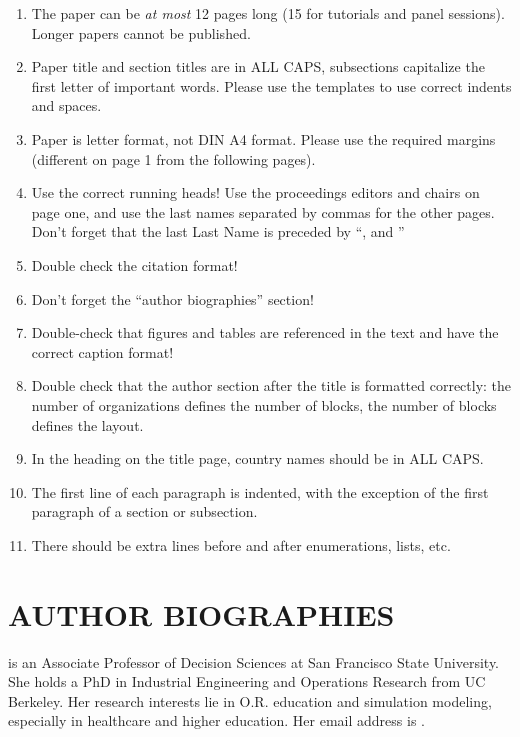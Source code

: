 \documentclass{wscpaperproc}
\theoremstyle{wsc}
\begin{document}
\begin{enumerate}
\item   The paper can be \textit{at most} 12 pages long (15 for tutorials and panel sessions). Longer papers cannot be published.
\item	Paper title and section titles are in ALL CAPS, subsections capitalize the first letter of important words. Please use the templates to use correct indents and spaces.
\item	Paper is letter format, not DIN A4 format. Please use the required margins (different on page 1 from the following pages).
\item	Use the correct running heads! Use the proceedings editors and chairs on page one, and use the last names separated by commas for the other pages. Don't forget that the last Last Name is preceded by ``, and ''
\item	Double check the citation format!
\item	Don't forget the ``author biographies'' section!
\item	Double-check that figures and tables are referenced in the text and have the correct caption format!
\item	Double check that the author section after the title is formatted correctly: the number of organizations defines the number of blocks, the number of blocks defines the layout.
\item	In the heading on the title page, country names should be in ALL CAPS.
\item	The first line of each paragraph is indented, with the exception of the first paragraph of a section or subsection.
\item	There should be extra lines before and after enumerations, lists, etc.
\end{enumerate}




\section*{AUTHOR BIOGRAPHIES}

 is an Associate Professor of Decision Sciences at San Francisco State University. She holds a PhD in Industrial Engineering and Operations Research from UC Berkeley. Her research interests lie in O.R. education and simulation modeling, especially in healthcare and higher education. Her email address is .\\
\end{document}
